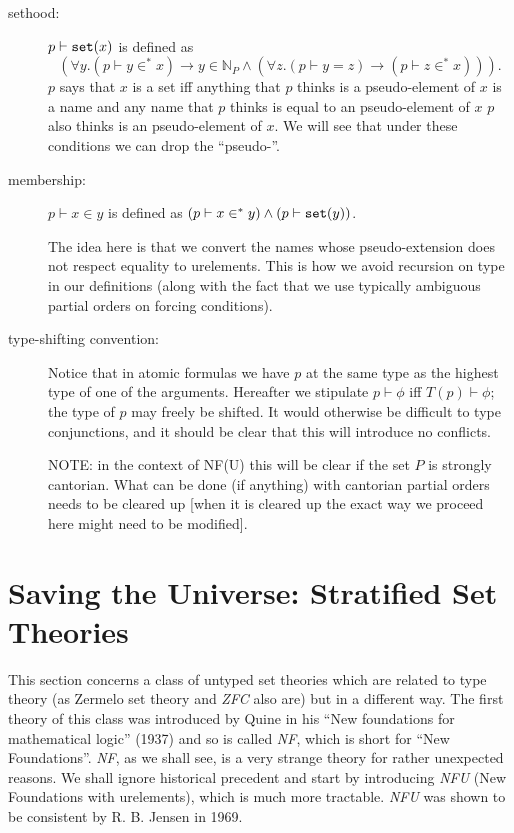 \documentclass[12pt]{book}
\begin{document}
\begin{description}
\begin{description}
\begin{description}
\item[sethood:] $p \vdash {\tt set}(x)$ is defined as $$(\forall y.(p
\vdash y \in^* x) \rightarrow y \in {\mathbb N}_P \wedge (\forall z.(p
\vdash y = z) \rightarrow (p \vdash z \in^* x))).$$ $p$ says that $x$
is a set iff anything that $p$ thinks is a pseudo-element of $x$ is a
name and any name that $p$ thinks is equal to an pseudo-element of $x$
$p$ also thinks is an pseudo-element of $x$.  We will see that under
these conditions we can drop the ``pseudo-''.

\item[membership:]  $p \vdash x \in y$ is defined as $(p \vdash x \in^* y) \wedge (p \vdash {\tt set}(y))$.

The idea here is that we convert the names whose pseudo-extension does
not respect equality to urelements.  This is how we avoid recursion on
type in our definitions (along with the fact that we use typically
ambiguous partial orders on forcing conditions).

\item[type-shifting convention:] Notice that in atomic formulas we
have $p$ at the same type as the highest type of one of the arguments.
Hereafter we stipulate $p \vdash \phi$ iff $T(p) \vdash \phi$; the
type of $p$ may freely be shifted.  It would otherwise be difficult to
type conjunctions, and it should be clear that this will introduce no
conflicts.

NOTE: in the context of NF(U) this will be clear if the set $P$ is
strongly cantorian.  What can be done (if anything) with cantorian
partial orders needs to be cleared up [when it is cleared up the exact
way we proceed here might need to be modified].



\end{description}

\end{description}



\end{description}

\chapter{Saving the Universe:  Stratified Set Theories}

This section concerns a class of untyped set theories which are
related to type theory (as Zermelo set theory and {\em ZFC\/} also
are) but in a different way.  The first theory of this class was
introduced by Quine in his ``New foundations for mathematical logic''
(1937) and so is called {\em NF\/}, which is short for ``New
Foundations''.  {\em NF\/}, as we shall see, is a very strange theory
for rather unexpected reasons.  We shall ignore historical precedent
and start by introducing {\em NFU\/} (New Foundations with
urelements), which is much more tractable.  {\em NFU\/} was shown to
be consistent by R. B. Jensen in 1969.
\end{document}
